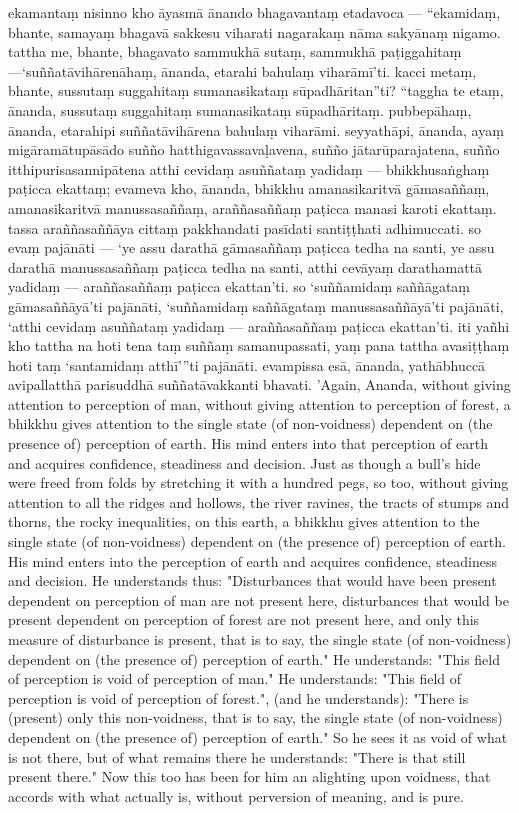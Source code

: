 \documentclass[11pt]{article}
\begin{document}
\begin{paracol}{2}
\begin{column}
\switchcolumn
ekamantaṃ nisinno kho āyasmā ānando bhagavantaṃ etadavoca — “ekamidaṃ, bhante, samayaṃ bhagavā sakkesu viharati nagarakaṃ nāma sakyānaṃ nigamo. tattha me, bhante, bhagavato sammukhā sutaṃ, sammukhā paṭiggahitaṃ —‘suññatāvihārenāhaṃ, ānanda, etarahi bahulaṃ viharāmī’ti. kacci metaṃ, bhante, sussutaṃ suggahitaṃ sumanasikataṃ sūpadhāritan”ti? “taggha te etaṃ, ānanda, sussutaṃ suggahitaṃ sumanasikataṃ sūpadhāritaṃ. pubbepāhaṃ, ānanda, etarahipi suññatāvihārena bahulaṃ viharāmi. seyyathāpi, ānanda, ayaṃ migāramātupāsādo suñño hatthigavassavaḷavena, suñño jātarūparajatena, suñño itthipurisasannipātena atthi cevidaṃ asuññataṃ yadidaṃ — bhikkhusaṅghaṃ paṭicca ekattaṃ; evameva kho, ānanda, bhikkhu amanasikaritvā gāmasaññaṃ, amanasikaritvā manussasaññaṃ, araññasaññaṃ paṭicca manasi karoti ekattaṃ. tassa araññasaññāya cittaṃ pakkhandati pasīdati santiṭṭhati adhimuccati. so evaṃ pajānāti — ‘ye assu darathā gāmasaññaṃ paṭicca tedha na santi, ye assu darathā manussasaññaṃ paṭicca tedha na santi, atthi cevāyaṃ darathamattā yadidaṃ — araññasaññaṃ paṭicca ekattan’ti. so ‘suññamidaṃ saññāgataṃ gāmasaññāyā’ti pajānāti, ‘suññamidaṃ saññāgataṃ manussasaññāyā’ti pajānāti, ‘atthi cevidaṃ asuññataṃ yadidaṃ — araññasaññaṃ paṭicca ekattan’ti. iti yañhi kho tattha na hoti tena taṃ suññaṃ samanupassati, yaṃ pana tattha avasiṭṭhaṃ hoti taṃ ‘santamidaṃ atthī’”ti pajānāti. evampissa esā, ānanda, yathābhuccā avipallatthā parisuddhā suññatāvakkanti bhavati.
\switchcolumn*
 'Again, Ananda, without giving attention to perception of man, without giving attention to perception of forest, a bhikkhu gives attention to the single state (of non-voidness) dependent on (the presence of) perception of earth. His mind enters into that perception of earth and acquires confidence, steadiness and decision. Just as though a bull's hide were freed from folds by stretching it with a hundred pegs, so too, without giving attention to all the ridges and hollows, the river ravines, the tracts of stumps and thorns, the rocky inequalities, on this earth, a bhikkhu gives attention to the single state (of non-voidness) dependent on (the presence of) perception of earth. His mind enters into the perception of earth and acquires confidence, steadiness and decision. He understands thus: "Disturbances that would have been present dependent on perception of man are not present here, disturbances that would be present dependent on perception of forest are not present here, and only this measure of disturbance is present, that is to say, the single state (of non-voidness) dependent on (the presence of) perception of earth." He understands: "This field of perception is void of perception of man." He understands: "This field of perception is void of perception of forest.", (and he understands): "There is (present) only this non-voidness, that is to say, the single state (of non-voidness) dependent on (the presence of) perception of earth." So he sees it as void of what is not there, but of what remains there he understands: "There is that still present there." Now this too has been for him an alighting upon voidness, that accords with what actually is, without perversion of meaning, and is pure.

\end{column}
\end{paracol}
\end{document}
